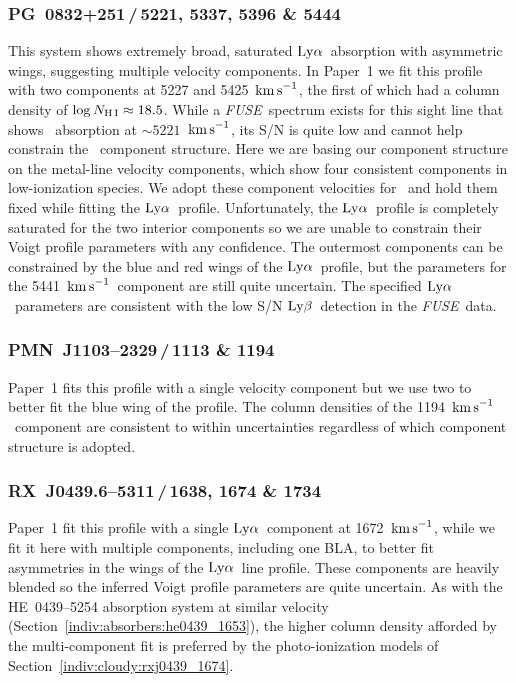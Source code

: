 \documentclass[twocolumn,twocolappendix,tighten,times]{aastex6}
\newcommand{\HI}{\ion{H}{1}}
\newcommand{\OVI}{\ion{O}{6}}
\newcommand{\fuse}{{\sl FUSE}}
\newcommand{\kms}{\ensuremath{{\rm km\,s}^{-1}}}
\newcommand{\lya}{\ensuremath{{\rm Ly}\alpha}}
\newcommand{\lyb}{\ensuremath{{\rm Ly}\beta}}
\begin{document}
\subsubsection{PG~0832+251\,/\,5221, 5337, 5396 \& 5444}
\label{indiv:absorbers:pg0832_5221}

This system shows extremely broad, saturated \lya\ absorption with
asymmetric  wings, suggesting multiple velocity components. In Paper~1
we fit this profile  with two components at 5227 and 5425~\kms, the
first of which had a column  density of $\log{N_{\rm
H\,I}}\approx18.5$. While a \fuse\ spectrum exists for this sight line
that shows \OVI\ absorption at $\sim5221$~\kms, its S/N is quite low
and cannot help constrain the \HI\ component structure. Here we are
basing our component structure on the metal-line velocity components,
which  show four consistent components in low-ionization species. We
adopt these  component velocities for \HI\ and hold them fixed while
fitting the \lya\ profile.  Unfortunately, the \lya\ profile is
completely saturated for the two interior  components so we are unable
to constrain their Voigt profile parameters with any confidence. The
outermost components can be constrained by the blue and red
wings of the \lya\ profile, but the parameters for the 5441~\kms\
component are still quite uncertain. The specified \lya\ parameters 
are consistent with the low S/N \lyb\ detection in the \fuse\ data.


\subsubsection{PMN~J1103--2329\,/\,1113 \& 1194}
\label{indiv:absorbers:p1103_1194}

Paper~1 fits this profile with a single velocity component but we use
two to better fit the blue wing of the profile. The column densities of 
the 1194~\kms\ component are consistent to within uncertainties regardless
of which component structure is adopted.


\subsubsection{RX~J0439.6--5311\,/\,1638, 1674 \& 1734}
\label{indiv:absorbers:rxj0439_1674}

Paper~1 \citep[and][]{keeney13} fit this profile with a
single \lya\  component at 1672~\kms, while we fit it here with
multiple components, including  one BLA, to better fit asymmetries in
the wings of the \lya\ line profile. These  components are heavily
blended so the inferred Voigt profile parameters are quite
uncertain. As with the HE~0439--5254 absorption system at similar
velocity  (Section~\ref{indiv:absorbers:he0439_1653}), the higher
column density afforded  by the multi-component fit is preferred by
the photo-ionization models of  Section~\ref{indiv:cloudy:rxj0439_1674}.
\end{document}
